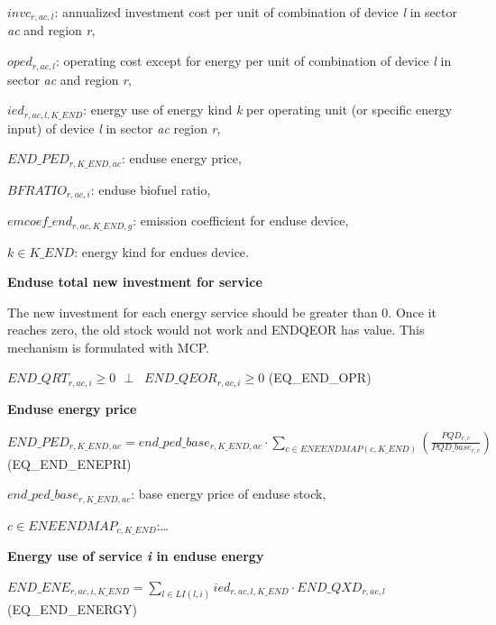 \documentclass[10pt,a4paper,titlepage,dvipdfmx]{book}
\begin{document}
\begin{flushleft}
$invc_{r,ac,l}$: annualized investment cost per unit of combination of device \textit{l} in sector \textit{ac} and region \textit{r},

$oped_{r,ac,l}$: operating cost except for energy per unit of combination of device \textit{l} in sector \textit{ac} and region \textit{r},

$ied_{r,ac,l,K\_ END}$: energy use of energy kind \textit{k} per operating unit (or specific energy input) of device \textit{l} in sector \textit{ac} region \textit{r},

$END\_ PED_{r,K\_ END,ac}$: enduse energy price,

$BFRATIO_{r,ac,i}$: enduse biofuel ratio,

$emcoef\_ end_{r,ac,K\_ END,g}$: emission coefficient for enduse device,

$k\in K\_ END$: energy kind for endues device.
\end{flushleft}

\begin{flushleft}\textbf{Enduse total new investment for service}\end{flushleft}

The new investment for each energy service should be greater than 0. Once it reaches zero, the old stock would not work and ENDQEOR has value. This mechanism is formulated with MCP.

$END\_ QRT_{r,ac,i}\geq 0\,\,\,\,\bot \,\,\,\,\,END\_ QEOR_{r,ac,i}\geq 0$  (EQ\_END\_OPR)

\begin{flushleft}\textbf{Enduse energy price}\end{flushleft}

$END\_ PED_{r,K\_ END,ac}=end\_ ped\_ base_{r,K\_ END,ac}\cdot \sum _{c\in ENEENDMAP(c,K\_ END)}\left(\frac{PQD_{r,c}}{PQD\_ base_{r,c}}\right)$ (EQ\_END\_ENEPRI)

\begin{flushleft}
$end\_ ped\_ base_{r,K\_ END,ac}$: base energy price of enduse stock,

$c\in ENEENDMAP_{c,K\_ END}$:{\ldots}
\end{flushleft}

\begin{flushleft}\textbf{Energy use of service \textit{i} in enduse energy}\end{flushleft}

$END\_ ENE_{r,ac,i,K\_ END}=\sum _{l\in LI(l,i)}ied_{r,ac,l,K\_ END}\cdot END\_ QXD_{r,ac,l}$  (EQ\_END\_ENERGY)
\end{document}
